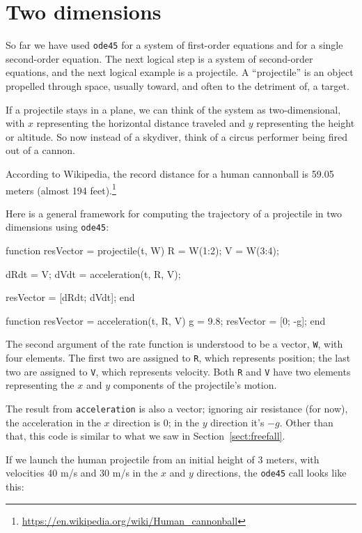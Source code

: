 \documentclass[
]{book}
\numberwithin{Answer}{chapter}
\numberwithin{Exercise}{chapter}
\begin{document}
\section{Two dimensions}
\label{sect:projectile}

So far we have used {\tt ode45} for a system of first-order
equations and for a single second-order equation.  The next logical
step is a system of second-order equations, and the next logical example
is a projectile.  A ``projectile'' is an object propelled
through space, usually toward,
and often to the detriment of,
a target.

If a projectile stays in a plane, we can think of the system as
two-dimensional, with $x$ representing the horizontal distance
traveled and $y$ representing the height or altitude.  So now
instead of a skydiver, think of a circus performer being fired
out of a cannon.

According to Wikipedia, the record distance for a human cannonball is
59.05 meters (almost 194
feet).\footnote{\url{https://en.wikipedia.org/wiki/Human_cannonball}}

Here is a general framework for computing the trajectory of a projectile
in two dimensions using {\tt ode45}:

\begin{code}
function resVector = projectile(t, W)
    R = W(1:2);
    V = W(3:4);

    dRdt = V;
    dVdt = acceleration(t, R, V);

    resVector = [dRdt; dVdt];
end

function resVector = acceleration(t, R, V)
    g = 9.8;             
    resVector = [0; -g];   %
end
\end{code}

The second argument of the rate function is understood to be a vector,
{\tt W}, with four elements.  The first two are assigned to {\tt R},
which represents position; the last two are assigned to {\tt V}, which
represents velocity. Both {\tt R} and {\tt V} have two elements
representing the $x$ and $y$ components of the projectile's motion.

The result from
{\tt acceleration} is also a vector; ignoring air resistance
(for now), the acceleration in the $x$ direction is 0; in
the $y$ direction it's $-g$.
Other than that, this code is similar to what we saw in
Section~\ref{sect:freefall}.

If we launch the human projectile from an initial height of
3 meters, with velocities 40 m/s and 30 m/s in the $x$ and $y$
directions, the {\tt ode45} call looks like
this:
\end{document}

